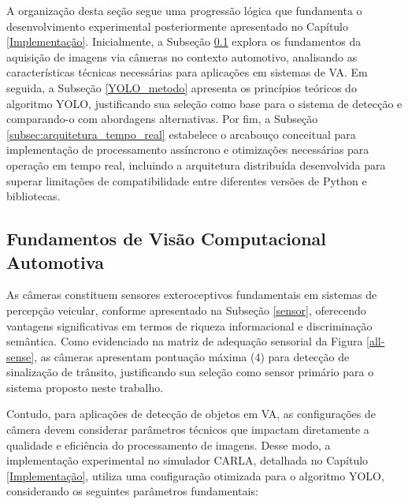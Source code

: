 A organização desta seção segue uma progressão lógica que fundamenta o desenvolvimento experimental posteriormente apresentado no Capítulo \ref{Implementação}. Inicialmente, a Subseção \ref{camera} explora os fundamentos da aquisição de imagens via câmeras no contexto automotivo, analisando as características técnicas necessárias para aplicações em sistemas de VA. Em seguida, a Subseção \ref{YOLO_metodo} apresenta os princípios teóricos do algoritmo YOLO, justificando sua seleção como base para o sistema de detecção e comparando-o com abordagens alternativas. Por fim, a Subseção \ref{subsec:arquitetura_tempo_real} estabelece o arcabouço conceitual para implementação de processamento assíncrono e otimizações necessárias para operação em tempo real, incluindo a arquitetura distribuída desenvolvida para superar limitações de compatibilidade entre diferentes versões de Python e bibliotecas.

\subsection{Fundamentos de Visão Computacional Automotiva} \label{camera}

As câmeras constituem sensores exteroceptivos fundamentais em sistemas de percepção veicular, conforme apresentado na Subseção \ref{sensor}, oferecendo vantagens significativas em termos de riqueza informacional e discriminação semântica. Como evidenciado na matriz de adequação sensorial da Figura \ref{all-sense}, as câmeras apresentam pontuação máxima (4) para detecção de sinalização de trânsito, justificando sua seleção como sensor primário para o sistema proposto neste trabalho.

Contudo, para aplicações de detecção de objetos em VA, as configurações de câmera devem considerar parâmetros técnicos que impactam diretamente a qualidade e eficiência do processamento de imagens. Desse modo, a implementação experimental no simulador CARLA, detalhada no Capítulo \ref{Implementação}, utiliza uma configuração otimizada para o algoritmo YOLO, considerando os seguintes parâmetros fundamentais:

